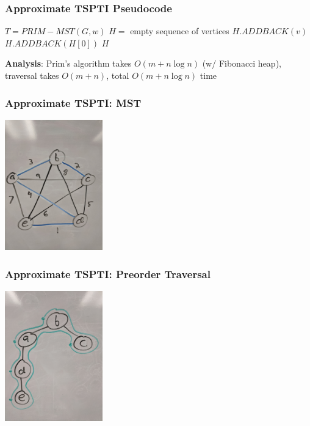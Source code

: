 \documentclass{beamer}
\begin{document}
  \begin{frame} \frametitle{Approximate TSPTI Pseudocode}
    \begin{algorithmic}[1]
        \State $T = PRIM-MST(G, w)$
        \State $H = $ empty sequence of vertices
          \State $H.ADDBACK(v)$
        \EndFor
        \State $H.ADDBACK(H[0])$
        \State \Return $H$
      \EndFunction
    \end{algorithmic}
  \vspace{.5 cm}
  \textbf{Analysis}: Prim's algorithm takes $O(m + n \log n)$ (w/ Fibonacci heap),
  traversal takes $O(m + n)$, total $O(m + n \log n)$ time
  \end{frame}
  
  \begin{frame} \frametitle{Approximate TSPTI: MST}
    \begin{center}
      \includegraphics[height=160pt]{13-tspti-mst.jpg}
    \end{center}
  \end{frame}
  
  \begin{frame} \frametitle{Approximate TSPTI: Preorder Traversal}
    \begin{center}
      \includegraphics[height=160pt]{13-tspti-preorder.jpg}
    \end{center}
  \end{frame}
  
\end{document}
